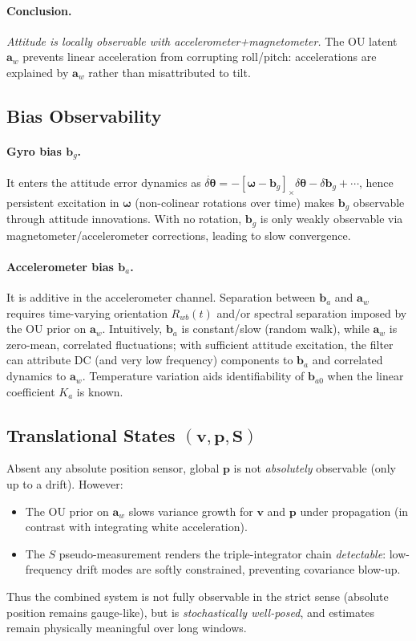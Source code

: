\documentclass[10pt]{extarticle}
\begin{document}
\paragraph{Conclusion.} \emph{Attitude is locally observable with accelerometer+magnetometer.}
The OU latent $\bm a_w$ prevents linear acceleration from corrupting roll/pitch:
accelerations are explained by $\bm a_w$ rather than misattributed to tilt.

\subsection{Bias Observability}
\paragraph{Gyro bias $\bm b_g$.} It enters the attitude error dynamics as 
$\dot{\delta\bm\theta}=-[\bm\omega-\bm b_g]_\times\delta\bm\theta - \delta\bm b_g + \cdots$,
hence persistent excitation in $\bm\omega$ (non-colinear rotations over time) makes
$\bm b_g$ observable through attitude innovations. With no rotation, $\bm b_g$ is only
weakly observable via magnetometer/accelerometer corrections, leading to slow convergence.

\paragraph{Accelerometer bias $\bm b_a$.} It is additive in the accelerometer channel.
Separation between $\bm b_a$ and $\bm a_w$ requires time-varying orientation $R_{wb}(t)$
and/or spectral separation imposed by the OU prior on $\bm a_w$. Intuitively, $\bm b_a$
is constant/slow (random walk), while $\bm a_w$ is zero-mean, correlated fluctuations;
with sufficient attitude excitation, the filter can attribute DC (and very low frequency)
components to $\bm b_a$ and correlated dynamics to $\bm a_w$. Temperature variation aids
identifiability of $\bm b_{a0}$ when the linear coefficient $K_a$ is known.

\subsection{Translational States \texorpdfstring{$(\bm v,\bm p,\bm S)$}{plain-text}}
Absent any absolute position sensor, global $\bm p$ is not \emph{absolutely} observable
(only up to a drift). However:
\begin{itemize}
\item The OU prior on $\bm a_w$ slows variance growth for $\bm v$ and $\bm p$
under propagation (in contrast with integrating white acceleration).
\item The $S$ pseudo-measurement renders the triple-integrator chain \emph{detectable}:
low-frequency drift modes are softly constrained, preventing covariance blow-up.
\end{itemize}
Thus the combined system is not fully observable in the strict sense (absolute position
remains gauge-like), but is \emph{stochastically well-posed},
and estimates remain physically meaningful over long windows.
\end{document}
